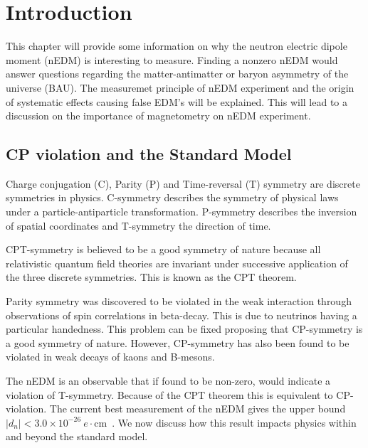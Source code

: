 \chapter{Introduction\label{ch:intro}}

This chapter will provide some information on why the neutron electric
dipole moment (nEDM) is interesting to measure.  Finding a nonzero
nEDM would answer questions regarding the matter-antimatter or baryon
asymmetry of the universe (BAU).  The measuremet principle of nEDM
experiment and the origin of systematic effects causing false EDM's
will be explained.  This will lead to a discussion on the importance
of magnetometry on nEDM experiment.

\section{CP violation and the Standard Model}

Charge conjugation (C), Parity (P) and Time-reversal (T) symmetry are
discrete symmetries in physics.  C-symmetry describes the symmetry of
physical laws under a particle-antiparticle transformation.
P-symmetry describes the inversion of spatial coordinates and
T-symmetry the direction of time.

CPT-symmetry is believed to be a good symmetry of nature because all
relativistic quantum field theories are invariant under successive
application of the three discrete symmetries.  This is known as the
CPT theorem.

Parity symmetry was discovered to be violated in the weak interaction
through observations of spin correlations in beta-decay.  This is due
to neutrinos having a particular handedness.  This problem can be
fixed proposing that CP-symmetry is a good symmetry of nature.
However, CP-symmetry has also been found to be violated in weak decays
of kaons and B-mesons.

The nEDM is an observable that if found to be non-zero, would indicate
a violation of T-symmetry.  Because of the CPT theorem this is
equivalent to CP-violation.  The current best measurement of the nEDM
gives the upper bound $|d_n|<3.0\times
10^{-26}~e\cdot$cm~\cite{bib:baker,bib:pendlebury-revised}.
We now discuss how this result impacts physics within and beyond the
standard model.

